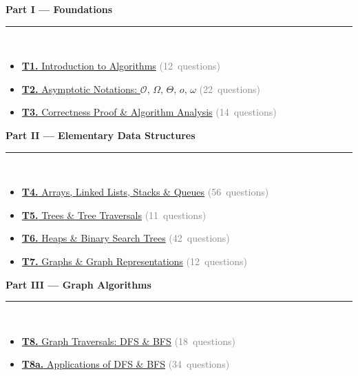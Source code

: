 \documentclass[12pt,a3paper]{article}
\begin{document}
\begin{tcolorbox}[colback=cA!5,colframe=cA,boxrule=1pt,arc=5pt,
  left=8pt,right=8pt,top=8pt,bottom=8pt,before skip=4pt]
  {\large\bfseries\textcolor{cA}{Part I --- Foundations}}\\[5pt]
  \textcolor{cA!40}{\rule{\textwidth}{0.4pt}}\\[3pt]
  \small\begin{itemize}[leftmargin=1.2em,itemsep=1pt,label={\textcolor{cA}{$\triangleright$}}]
    \item \hyperref[sec:T1]{\textbf{T1.} Introduction to Algorithms} \textcolor{gray}{\small(12~questions)}
    \item \hyperref[sec:T2]{\textbf{T2.} Asymptotic Notations: $\mathcal{O},\,\Omega,\,\Theta,\,o,\,\omega$} \textcolor{gray}{\small(22~questions)}
    \item \hyperref[sec:T3]{\textbf{T3.} Correctness Proof \& Algorithm Analysis} \textcolor{gray}{\small(14~questions)}
  \end{itemize}
\end{tcolorbox}

\begin{tcolorbox}[colback=cB!5,colframe=cB,boxrule=1pt,arc=5pt,
  left=8pt,right=8pt,top=8pt,bottom=8pt,before skip=4pt]
  {\large\bfseries\textcolor{cB}{Part II --- Elementary Data Structures}}\\[5pt]
  \textcolor{cB!40}{\rule{\textwidth}{0.4pt}}\\[3pt]
  \small\begin{itemize}[leftmargin=1.2em,itemsep=1pt,label={\textcolor{cB}{$\triangleright$}}]
    \item \hyperref[sec:T4]{\textbf{T4.} Arrays, Linked Lists, Stacks \& Queues} \textcolor{gray}{\small(56~questions)}
    \item \hyperref[sec:T5]{\textbf{T5.} Trees \& Tree Traversals} \textcolor{gray}{\small(11~questions)}
    \item \hyperref[sec:T6]{\textbf{T6.} Heaps \& Binary Search Trees} \textcolor{gray}{\small(42~questions)}
    \item \hyperref[sec:T7]{\textbf{T7.} Graphs \& Graph Representations} \textcolor{gray}{\small(12~questions)}
  \end{itemize}
\end{tcolorbox}

\begin{tcolorbox}[colback=cC!5,colframe=cC,boxrule=1pt,arc=5pt,
  left=8pt,right=8pt,top=8pt,bottom=8pt,before skip=4pt]
  {\large\bfseries\textcolor{cC}{Part III --- Graph Algorithms}}\\[5pt]
  \textcolor{cC!40}{\rule{\textwidth}{0.4pt}}\\[3pt]
  \small\begin{itemize}[leftmargin=1.2em,itemsep=1pt,label={\textcolor{cC}{$\triangleright$}}]
    \item \hyperref[sec:T8]{\textbf{T8.} Graph Traversals: DFS \& BFS} \textcolor{gray}{\small(18~questions)}
    \item \hyperref[sec:T8a]{\textbf{T8a.} Applications of DFS \& BFS} \textcolor{gray}{\small(34~questions)}
  \end{itemize}
\end{tcolorbox}
\end{document}
